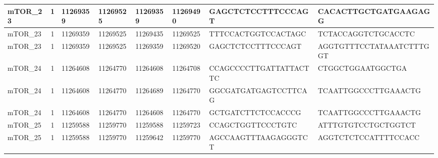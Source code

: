 \begin{landscape}
\begin{longtable}{| p{} | p{} | p{} | p{} | p{} | p{} | p{} | p{} |}
\multicolumn{1}{|l|}{mTOR\_23}   & \multicolumn{1}{c|}{1}  & \multicolumn{1}{l|}{11269359}  & \multicolumn{1}{l|}{11269525}  & \multicolumn{1}{l|}{11269359}  & \multicolumn{1}{l|}{11269490}  & \multicolumn{1}{l|}{GAGCTCTCCTTTCCCAGT}              & \multicolumn{1}{l|}{CACACTTGCTGATGAAGAGG}          \\ \hline
\multicolumn{1}{|l|}{mTOR\_23}   & \multicolumn{1}{c|}{1}  & \multicolumn{1}{l|}{11269359}  & \multicolumn{1}{l|}{11269525}  & \multicolumn{1}{l|}{11269435}  & \multicolumn{1}{l|}{11269525}  & \multicolumn{1}{l|}{TTTCCACTGGTCCACTAGC}             & \multicolumn{1}{l|}{TCTACCAGGTCTGCACCTC}           \\ \hline
\multicolumn{1}{|l|}{mTOR\_23}   & \multicolumn{1}{c|}{1}  & \multicolumn{1}{l|}{11269359}  & \multicolumn{1}{l|}{11269525}  & \multicolumn{1}{l|}{11269359}  & \multicolumn{1}{l|}{11269520}  & \multicolumn{1}{l|}{GAGCTCTCCTTTCCCAGT}              & \multicolumn{1}{l|}{AGGTGTTTCCTATAAATCTTTGGT}      \\ \hline
\multicolumn{1}{|l|}{mTOR\_24}   & \multicolumn{1}{c|}{1}  & \multicolumn{1}{l|}{11264608}  & \multicolumn{1}{l|}{11264770}  & \multicolumn{1}{l|}{11264608}  & \multicolumn{1}{l|}{11264708}  & \multicolumn{1}{l|}{CCAGCCCCTTGATTATTACTTC}          & \multicolumn{1}{l|}{CTGGCTGGAATGGCTGA}             \\ \hline
\multicolumn{1}{|l|}{mTOR\_24}   & \multicolumn{1}{c|}{1}  & \multicolumn{1}{l|}{11264608}  & \multicolumn{1}{l|}{11264770}  & \multicolumn{1}{l|}{11264689}  & \multicolumn{1}{l|}{11264770}  & \multicolumn{1}{l|}{GGCGATGATGAGTCCTTCAG}            & \multicolumn{1}{l|}{TCAATTGGCCCTTGAAACTG}          \\ \hline
\multicolumn{1}{|l|}{mTOR\_24}   & \multicolumn{1}{c|}{1}  & \multicolumn{1}{l|}{11264608}  & \multicolumn{1}{l|}{11264770}  & \multicolumn{1}{l|}{11264608}  & \multicolumn{1}{l|}{11264770}  & \multicolumn{1}{l|}{GCTGATCTTCTCCACCCG}              & \multicolumn{1}{l|}{TCAATTGGCCCTTGAAACTG}          \\ \hline
\multicolumn{1}{|l|}{mTOR\_25}   & \multicolumn{1}{c|}{1}  & \multicolumn{1}{l|}{11259588}  & \multicolumn{1}{l|}{11259770}  & \multicolumn{1}{l|}{11259588}  & \multicolumn{1}{l|}{11259723}  & \multicolumn{1}{l|}{CCAGCTGGTTCCCTGTC}               & \multicolumn{1}{l|}{ATTTGTGTCCTGCTGGTCT}           \\ \hline
\multicolumn{1}{|l|}{mTOR\_25}   & \multicolumn{1}{c|}{1}  & \multicolumn{1}{l|}{11259588}  & \multicolumn{1}{l|}{11259770}  & \multicolumn{1}{l|}{11259642}  & \multicolumn{1}{l|}{11259770}  & \multicolumn{1}{l|}{AGCCAAGTTTAAGAGGGTCT}            & \multicolumn{1}{l|}{AGGTCTCTCCATTTTCCACC}          \\ \hline

\end{longtable}
\end{landscape}
